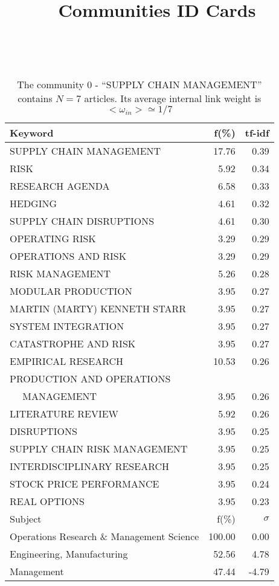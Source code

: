 \documentclass[a4paper,11pt]{report}
\title{{\bf Communities ID Cards}}
\date{\begin{flushleft}This document gather the ``ID Cards'' of the CC communities found within your database.\\
 The CC network was built by keeping a link between articles sharing at least 5 references. The communities characterized here correspond to the ones found in the level 1 (in the sense of the Louvain algo) which gathers more than 0 articles.\\
 These ID cards displays the most frequent keywords, subject categories, journals of publication, institution, countries, authors, references and reference journals of the articles of each community. The significance of an item $\sigma = \sqrt{N} (f - p) / \sqrt{p(1-p)}$ [where $N$ is the number of articles within the community and $f$ and $p$ are the proportion of articles respectively within the community and within the database displaying that item ] is also given (for example $\sigma > 5$ is really highly significant). The tf-idf value which can be calculated by $tf-idf = f*log(frac{1}{p})$ is also given.\\
\vspace{1cm}
\copyright Sebastian Grauwin, Liu Weizhi - (2014) \end{flushleft}}
\begin{document}
\begin{landscape}
\maketitle
\clearpage

\begin{table}[!ht]
\caption{The community 0 - ``SUPPLY CHAIN MANAGEMENT'' contains $N = 7$ articles. Its average internal link weight is $<\omega_{in}> \simeq 1/7$ }
\textcolor{white}{aa}\\
{\scriptsize\begin{tabular}{|l r  r|}
\hline
Keyword & f(\%) & tf-idf \\
\hline
SUPPLY CHAIN MANAGEMENT & 17.76 & 0.39\\
RISK & 5.92 & 0.34\\
RESEARCH AGENDA & 6.58 & 0.33\\
HEDGING & 4.61 & 0.32\\
SUPPLY CHAIN DISRUPTIONS & 4.61 & 0.30\\
OPERATING RISK & 3.29 & 0.29\\
OPERATIONS AND RISK & 3.29 & 0.29\\
RISK MANAGEMENT & 5.26 & 0.28\\
MODULAR PRODUCTION & 3.95 & 0.27\\
MARTIN (MARTY) KENNETH STARR & 3.95 & 0.27\\
SYSTEM INTEGRATION & 3.95 & 0.27\\
CATASTROPHE AND RISK & 3.95 & 0.27\\
EMPIRICAL RESEARCH & 10.53 & 0.26\\
PRODUCTION AND OPERATIONS &  &\\
$\quad$ MANAGEMENT & 3.95 & 0.26\\
LITERATURE REVIEW & 5.92 & 0.26\\
DISRUPTIONS & 3.95 & 0.25\\
SUPPLY CHAIN RISK MANAGEMENT & 3.95 & 0.25\\
INTERDISCIPLINARY RESEARCH & 3.95 & 0.25\\
STOCK PRICE PERFORMANCE & 3.95 & 0.24\\
REAL OPTIONS & 3.95 & 0.23\\
\hline
\hline
Subject & f(\%) & $\sigma$\\
\hline
Operations Research \& Management Science & 100.00 & 0.00\\
Engineering, Manufacturing & 52.56 & 4.78\\
Management & 47.44 & -4.79\\

\end{tabular}}
\end{table}
\end{landscape}
\end{document}
